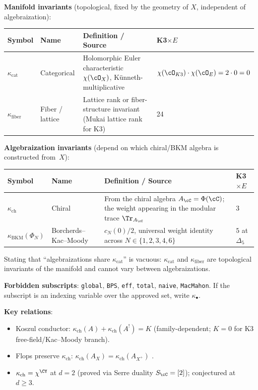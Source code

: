 \medskip\noindent
\textbf{Manifold invariants} (topological, fixed by the geometry of $X$,
independent of algebraization):
\begin{center}
\begin{tabular}{@{}lp{4.5cm}p{5cm}l@{}}
\toprule
\textbf{Symbol} & \textbf{Name} & \textbf{Definition / Source} & \textbf{K3$\times E$} \\
\midrule
$\kappa_{\mathrm{cat}}$ & Categorical &
 Holomorphic Euler characteristic $\chi(\cO_X)$, Künneth-multiplicative & $\chi(\cO_{K3}) \cdot \chi(\cO_E) = 2 \cdot 0 = 0$ \\
$\kappa_{\mathrm{fiber}}$ & Fiber / lattice &
 Lattice rank or fiber-structure invariant
 (Mukai lattice rank for K3) & 24 \\
\bottomrule
\end{tabular}
\end{center}

\noindent
\textbf{Algebraization invariants} (depend on which chiral/BKM algebra
is constructed from~$X$):
\begin{center}
\begin{tabular}{@{}lp{4.5cm}p{5cm}l@{}}
\toprule
\textbf{Symbol} & \textbf{Name} & \textbf{Definition / Source} & \textbf{K3$\times E$} \\
\midrule
$\kappa_{\mathrm{ch}}$ & Chiral &
 From the chiral algebra $A_\cC = \Phi(\cC)$; the weight
 appearing in the modular trace $\Tr_{A_\cC}$ & 3 \\
$\kappa_{\mathrm{BKM}}(\Phi_N)$ & Borcherds--Kac--Moody &
 $c_N(0)/2$, universal weight identity
 across $N \in \{1, 2, 3, 4, 6\}$ & $5$ at $\Delta_5$ \\
\bottomrule
\end{tabular}
\end{center}

\noindent
Stating that ``algebraizations share $\kappa_{\mathrm{cat}}$'' is vacuous:
$\kappa_{\mathrm{cat}}$ and $\kappa_{\mathrm{fiber}}$ are topological
invariants of the manifold and cannot vary between algebraizations.

\medskip\noindent
\textbf{Forbidden subscripts}: \texttt{global}, \texttt{BPS},
\texttt{eff}, \texttt{total}, \texttt{naive}, \texttt{MacMahon}.
If the subscript is an indexing variable over the approved set,
write $\kappa_\bullet$.

\medskip\noindent
\textbf{Key relations}:
\begin{itemize}[nosep]
\item Koszul conductor: $\kappa_{\mathrm{ch}}(A) +
 \kappa_{\mathrm{ch}}(A^!) = K$ (family-dependent; $K = 0$ for
 K3 free-field/Kac--Moody branch).
\item Flops preserve $\kappa_{\mathrm{ch}}$:
 $\kappa_{\mathrm{ch}}(A_X) = \kappa_{\mathrm{ch}}(A_{X^+})$
.
\item $\kappa_{\mathrm{ch}} = \chi^{\CY}$ at $d = 2$ (proved via
 Serre duality $S_\cC = [2]$); conjectured at $d \ge 3$.
\end{itemize}

